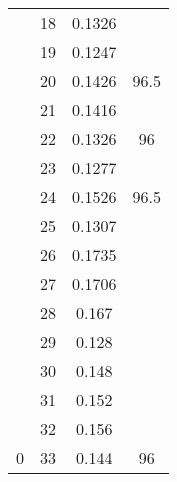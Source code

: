 \documentclass{article}
\begin{document}
\begin{multicols}{2}
\begin{table}[H]
\begin{tabular}{|c|c|c|c|}
 & 18 & 0.1326 &  \\ \cline{2-3}
 & 19 & 0.1247 &  \\ \cline{2-3}
 & 20 & 0.1426 & \multirow{-4}{*}{96.5} \\ \cline{2-4} 
 & 21 & 0.1416 &  \\ \cline{2-3}
 & 22 & 0.1326 & \multirow{-2}{*}{96} \\ \cline{2-4} 
 & 23 & 0.1277 &  \\ \cline{2-3}
 & 24 & 0.1526 & \multirow{-2}{*}{96.5} \\ \cline{2-4} 
 & 25 & 0.1307 &  \\ \cline{2-3}
 & 26 & 0.1735 &  \\ \cline{2-3}
 & 27 & 0.1706 &  \\ \cline{2-3}
 & 28 & 0.167 &  \\ \cline{2-3}
 & 29 & 0.128 &  \\ \cline{2-3}
 & 30 & 0.148 &  \\ \cline{2-3}
 & 31 & 0.152 &  \\ \cline{2-3}
 & 32 & 0.156 &  \\ \cline{2-3}
\multirow{-34}{*}{0} & 33 & 0.144 & \multirow{-9}{*}{96} \\ \hline
\end{tabular}
\end{table}



\end{multicols}
\end{document}

